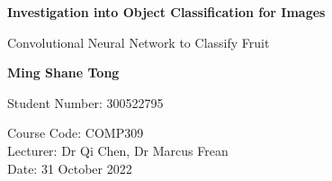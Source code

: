 \documentclass[../main.tex]{subfiles}
\begin{document}
\begin{titlepage}
    \begin{center}
        \vspace*{1cm}
            
        \Huge
        \textbf{Investigation into Object Classification for Images}
            
        \vspace{0.5cm}
        \LARGE
        Convolutional Neural Network to Classify Fruit
            
        \vspace{1.5cm}
            
        \textbf{Ming Shane Tong}
            
        \vfill
            
        Student Number: 300522795
            
        \vspace{0.8cm}
        
        \Large
        Course Code: COMP309\\
        Lecturer: Dr Qi Chen, Dr Marcus Frean\\
        Date: 31 October 2022
            
    \end{center}
\end{titlepage}
\end{document}
